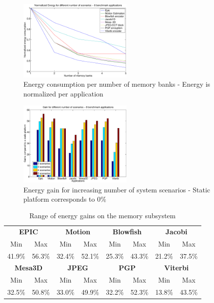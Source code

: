 \documentclass[a4paper,conference]{IEEEtran}
\begin{document}
\begin{figure}[!t]
\centering
\includegraphics[width=0.50\textwidth]{Images/6apps.eps}
\caption{Energy consumption per number of memory banks - Energy is normalized per application}
\label{fig:energy}
\end{figure}

\begin{figure}[!t]
\centering
\includegraphics[width=0.50\textwidth]{Images/6appsGains.eps}
\caption{Energy gain for increasing number of system scenarios - Static platform corresponds to 0\%}
\label{fig:gains}
\end{figure}

\begin{center}
	\begin{table}[!t]
	\caption{Range of energy gains on the memory subsystem}
	\label{tab:ranges}
	{\small
	\hfill{}
	\begin{tabular}{|c|c|c|c|c|c|c|c|}
		\hline
		\multicolumn{2}{|c|}{\textbf{EPIC}} &
		\multicolumn{2}{c|}{\textbf{Motion}} &
		\multicolumn{2}{c|}{\textbf{Blowfish}} &
		\multicolumn{2}{c|}{\textbf{Jacobi}}
		\\ 
		\cline{1-8}
		Min & Max & Min & Max & Min & Max & 
		Min & Max \\ 
		\hline 
		41.9\% & 56.3\% & 32.4\% & 52.1\% & 25.3\% & 43.3\% & 
		21.2\% & 37.5\% \\ 
		\hline 

		\multicolumn{2}{|c|}{\textbf{Mesa3D}} &
		\multicolumn{2}{c|}{\textbf{JPEG}} &
		\multicolumn{2}{c|}{\textbf{PGP}} &
		\multicolumn{2}{c|}{\textbf{Viterbi}} \\ 
		\cline{1-8}
		Min & Max & Min & Max & Min & Max & 
		Min & Max \\ 
		\hline 
		32.5\% & 50.8\% & 33.0\% & 49.9\% & 
		32.2\% & 52.3\% & 13.8\% & 43.5\% \\ 
		\hline 
		
	\end{tabular}
	\hfill{}}
	\end{table}
\end{center}
\end{document}

